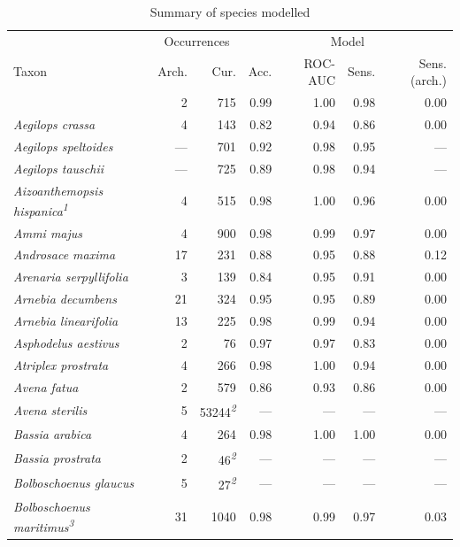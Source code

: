\documentclass[
  authoryear,
  preprint]{elsarticle}
\begin{document}
\begin{longtable}{@{\extracolsep{\fill}}lrrrrrr}

\caption{\label{tbl-results-summary}Summary of species modelled}

\tabularnewline

\toprule
 & \multicolumn{2}{c}{Occurrences} & \multicolumn{4}{c}{Model} \\ 
\cmidrule(lr){2-3} \cmidrule(lr){4-7}
Taxon & Arch. & Cur. & Acc. & ROC-AUC & Sens. & Sens. (arch.) \\ 
\midrule\addlinespace[2.5pt]
{\itshape Adonis dentata} & 2 & 715 & 0.99 & 1.00 & 0.98 & 0.00 \\ 
{\itshape Aegilops crassa} & 4 & 143 & 0.82 & 0.94 & 0.86 & 0.00 \\ 
{\itshape Aegilops speltoides} & — & 701 & 0.92 & 0.98 & 0.95 & — \\ 
{\itshape Aegilops tauschii} & — & 725 & 0.89 & 0.98 & 0.94 & — \\ 
{\itshape Aizoanthemopsis hispanica}\textsuperscript{\textit{1}} & 4 & 515 & 0.98 & 1.00 & 0.96 & 0.00 \\ 
{\itshape Ammi majus} & 4 & 900 & 0.98 & 0.99 & 0.97 & 0.00 \\ 
{\itshape Androsace maxima} & 17 & 231 & 0.88 & 0.95 & 0.88 & 0.12 \\ 
{\itshape Arenaria serpyllifolia} & 3 & 139 & 0.84 & 0.95 & 0.91 & 0.00 \\ 
{\itshape Arnebia decumbens} & 21 & 324 & 0.95 & 0.95 & 0.89 & 0.00 \\ 
{\itshape Arnebia linearifolia} & 13 & 225 & 0.98 & 0.99 & 0.94 & 0.00 \\ 
{\itshape Asphodelus aestivus} & 2 & 76 & 0.97 & 0.97 & 0.83 & 0.00 \\ 
{\itshape Atriplex prostrata} & 4 & 266 & 0.98 & 1.00 & 0.94 & 0.00 \\ 
{\itshape Avena fatua} & 2 & 579 & 0.86 & 0.93 & 0.86 & 0.00 \\ 
{\itshape Avena sterilis} & 5 & 53244\textsuperscript{\textit{2}} & — & — & — & — \\ 
{\itshape Bassia arabica} & 4 & 264 & 0.98 & 1.00 & 1.00 & 0.00 \\ 
{\itshape Bassia prostrata} & 2 & 46\textsuperscript{\textit{2}} & — & — & — & — \\ 
{\itshape Bolboschoenus glaucus} & 5 & 27\textsuperscript{\textit{2}} & — & — & — & — \\ 
{\itshape Bolboschoenus maritimus}\textsuperscript{\textit{3}} & 31 & 1040 & 0.98 & 0.99 & 0.97 & 0.03 \\ 

\end{longtable}
\end{document}
